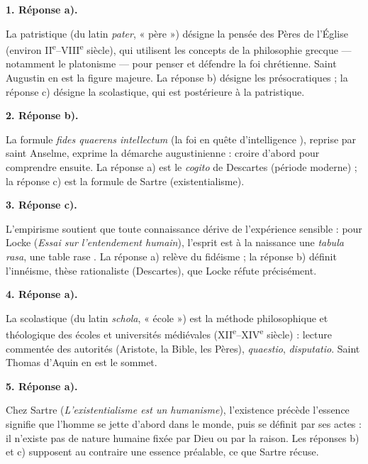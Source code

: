 \documentclass[11pt]{article}
\newcommand{\cle}[1]{{\popxbold\color{popdark}#1}}
\begin{document}
\begin{corrige}

\textbf{1. Réponse a).}\par La \cle{patristique} (du latin \emph{pater}, « père ») désigne la pensée des Pères de l'Église (environ II\textsuperscript{e}--VIII\textsuperscript{e} siècle), qui utilisent les concepts de la philosophie grecque — notamment le platonisme — pour penser et défendre la foi chrétienne. Saint Augustin en est la figure majeure. La réponse b) désigne les présocratiques ; la réponse c) désigne la scolastique, qui est postérieure à la patristique.

\textbf{2. Réponse b).}\par La formule \emph{fides quaerens intellectum} (\guillemotleft la foi en quête d'intelligence \guillemotright), reprise par saint Anselme, exprime la démarche augustinienne : croire d'abord pour comprendre ensuite. La réponse a) est le \emph{cogito} de Descartes (période moderne) ; la réponse c) est la formule de Sartre (existentialisme).

\textbf{3. Réponse c).}\par L'\cle{empirisme} soutient que toute connaissance dérive de l'expérience sensible : pour Locke (\emph{Essai sur l'entendement humain}), l'esprit est à la naissance une \emph{tabula rasa}, une \guillemotleft table rase \guillemotright. La réponse a) relève du fidéisme ; la réponse b) définit l'innéisme, thèse rationaliste (Descartes), que Locke réfute précisément.

\textbf{4. Réponse a).}\par La \cle{scolastique} (du latin \emph{schola}, « école ») est la méthode philosophique et théologique des écoles et universités médiévales (XII\textsuperscript{e}--XIV\textsuperscript{e} siècle) : lecture commentée des autorités (Aristote, la Bible, les Pères), \emph{quaestio}, \emph{disputatio}. Saint Thomas d'Aquin en est le sommet.

\textbf{5. Réponse a).}\par Chez Sartre (\emph{L'existentialisme est un humanisme}), \guillemotleft l'existence précède l'essence \guillemotright signifie que l'homme se jette d'abord dans le monde, puis se définit par ses actes : il n'existe pas de nature humaine fixée par Dieu ou par la raison. Les réponses b) et c) supposent au contraire une essence préalable, ce que Sartre récuse.

\end{corrige}
\end{document}
